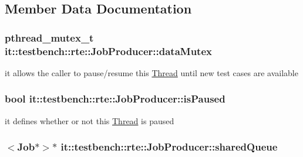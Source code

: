 \subsection{Member Data Documentation}
\hypertarget{classit_1_1testbench_1_1rte_1_1JobProducer_aa518f9cd4f229ed05e4e264152ac6fd4}{
\subsubsection[{data\-Mutex}]{\setlength{\rightskip}{0pt plus 5cm}pthread\-\_\-mutex\-\_\-t it\-::testbench\-::rte\-::\-Job\-Producer\-::data\-Mutex\hspace{0.3cm}{\ttfamily [private]}}}\label{de/d4e/classit_1_1testbench_1_1rte_1_1JobProducer_aa518f9cd4f229ed05e4e264152ac6fd4}
it allows the caller to pause/resume this \hyperlink{classit_1_1testbench_1_1rte_1_1Thread}{Thread} until new test cases are available \hypertarget{classit_1_1testbench_1_1rte_1_1JobProducer_af3876f44c46fc6b41a50a2171e3c3ba8}{
\subsubsection[{is\-Paused}]{\setlength{\rightskip}{0pt plus 5cm}bool it\-::testbench\-::rte\-::\-Job\-Producer\-::is\-Paused\hspace{0.3cm}{\ttfamily [private]}}}\label{de/d4e/classit_1_1testbench_1_1rte_1_1JobProducer_af3876f44c46fc6b41a50a2171e3c3ba8}
it defines whether or not this \hyperlink{classit_1_1testbench_1_1rte_1_1Thread}{Thread} is paused \hypertarget{classit_1_1testbench_1_1rte_1_1JobProducer_a10a14d85ca5c22ff91f92ebf32d4801a}{
\subsubsection[{shared\-Queue}]{$<${\bf Job}$\ast$$>$$\ast$ it\-::testbench\-::rte\-::\-Job\-Producer\-::shared\-Queue\hspace{0.3cm}{\ttfamily [private]}}}\label{de/d4e/classit_1_1testbench_1_1rte_1_1JobProducer_a10a14d85ca5c22ff91f92ebf32d4801a}
